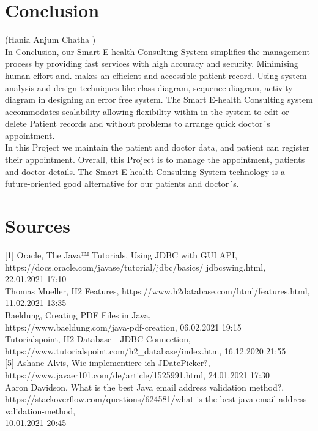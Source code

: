 \documentclass[a4paper, 12pt]{report}
\begin{document}
\chapter{Conclusion}
{\tiny (Hania Anjum Chatha )\\}
In Conclusion, our Smart E-health Consulting System simplifies the management process by providing fast services with high accuracy and security. Minimising human effort and. makes an efficient and accessible patient record. Using system analysis and design techniques like class diagram, sequence diagram, activity diagram in designing an error free system. The Smart E-health Consulting system accommodates scalability allowing flexibility within in the system to edit or delete Patient records and without problems to arrange quick doctor´s appointment. \\
In this Project we maintain the patient and doctor data, and patient can register their appointment. Overall, this Project is to manage the appointment, patients and doctor details. The Smart E-health Consulting System technology is a future-oriented good alternative for our patients and doctor´s.

\chapter{Sources}

[1] Oracle, The Java™ Tutorials, Using JDBC with GUI API,\\
https://docs.oracle.com/javase/tutorial/jdbc/basics/		jdbcswing.html, \\22.01.2021 17:10 \\\relax
[2] Thomas Mueller, H2 Features, https://www.h2database.com/html/features.html,\\ 11.02.2021 13:35 \\\relax
[3] Baeldung, Creating PDF Files in Java, \\https://www.baeldung.com/java-pdf-creation, 06.02.2021 19:15 \\\relax
[4] Tutorialspoint, H2 Database - JDBC Connection, \\https://www.tutorialspoint.com/h2_database/index.htm, 16.12.2020 21:55 \\\relax
[5] Ashane Alvis, Wie implementiere ich JDatePicker?, \\https://www.javaer101.com/de/article/1525991.html, 24.01.2021 17:30 \\\relax
[6] Aaron Davidson, What is the best Java email address validation method?, \\https://stackoverflow.com/questions/624581/what-is-the-best-java-email-address-validation-method, \\10.01.2021 20:45
\end{document}
